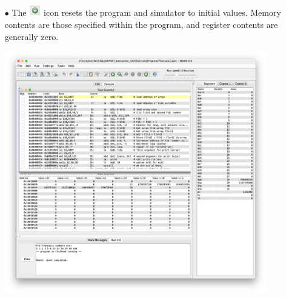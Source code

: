 \documentclass[12pt]{article}
\begin{document}
\begin{enumerate}
    \begin{itemize}
        \newpage
        \item[$\bullet$] The \includegraphics[width=0.04\textwidth]{20.png} icon resets the program and simulator to initial values. Memory contents are those specified within the program, and register contents are generally zero. 
        \begin{center}
            \includegraphics[width=0.9\textwidth]{21.png}
         \end{center}


\end{itemize}
\end{enumerate}
\end{document}
